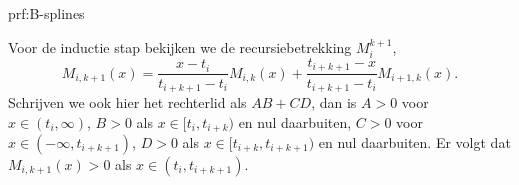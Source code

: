 \begin{prf}[B-splines]{prf:B-splines}
\begin{enumerate}
            Voor de inductie stap bekijken we de recursiebetrekking $M_i^{k+1}$,
            \begin{equation*}
                M_{i,k+1}(x) = \frac{x-t_i}{t_{i+k+1}-t_i} M_{i,k}(x) + \frac{t_{i+k+1}-x}{t_{i+k+1}-t_{i}} M_{i+1,k}(x).
            \end{equation*}
            Schrijven we ook hier het rechterlid als $AB + CD$, dan is $A >0$ voor $x \in (t_i,\infty)$, $B>0$ als $x\in [t_i,t_{i+k})$ en nul daarbuiten, $C>0$ voor $x \in (-\infty,t_{i+k+1})$, $D>0$ als $x\in [t_{i+k},t_{i+k+1})$ en nul daarbuiten.  Er volgt dat $M_{i,k+1}(x) >0$ als $x \in (t_i,t_{i+k+1})$.
    \end{enumerate}
\end{prf}